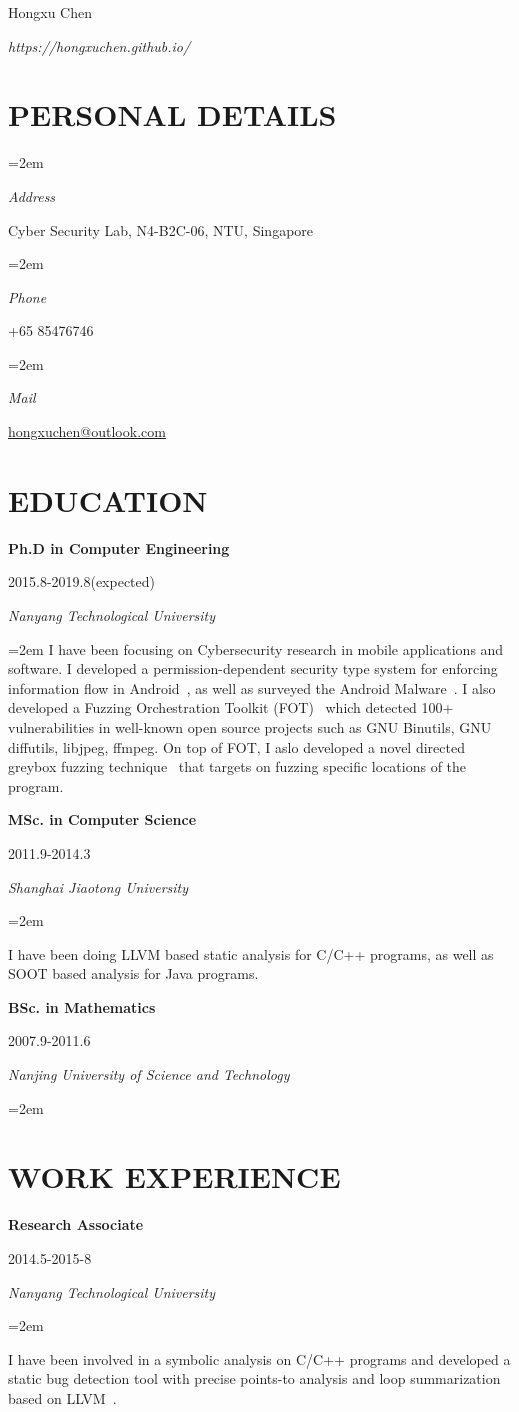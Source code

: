 \documentclass[paper=a4,fontsize=11pt]{scrartcl} %
\newlength{\spacebox}
\newcommand{\sepspace}{\vspace*{9pt}}		%
\newcommand{\MyName}[1]{ %
		\Huge \usefont{OT1}{phv}{b}{n} \hfill #1
		\par \normalsize \normalfont}
\newcommand{\MySlogan}[1]{ %
		\large \usefont{OT1}{phv}{m}{n}\hfill \textit{#1}
		\par \normalsize \normalfont}
\newcommand{\NewPart}[1]{\section*{\uppercase{#1}}}
\newcommand{\PersonalEntry}[2]{
		\noindent\hangindent=2em\hangafter=0 %
		\parbox{\spacebox}{        %
		\textit{#1}}		       %
		\hspace{1.5em} #2 \par}    %
\newcommand{\EducationEntry}[4]{
		\noindent \textbf{#1} \hfill      %
			\parbox{12em}{%
			\hfill\color{Black}#2} \par  %
		\noindent \textit{#3} \par        %
		\noindent\hangindent=2em\hangafter=0 \small #4 %
		\normalsize \par}
\begin{document}
\nocite{*}


\MyName{Hongxu Chen}
\MySlogan{{https://hongxuchen.github.io/}}


\sepspace

\NewPart{Personal details}{}

\PersonalEntry{Address}{Cyber Security Lab, N4-B2C-06, NTU, Singapore}
\PersonalEntry{Phone}{+65 85476746}
\PersonalEntry{Mail}{\url{hongxuchen@outlook.com}}

\NewPart{Education}{}

\EducationEntry{Ph.D in Computer Engineering}{2015.8-2019.8(expected)}{Nanyang Technological University}{
    I have been focusing on Cybersecurity research in mobile applications and software. I developed a permission-dependent security type system for enforcing information flow in Android~\cite{sta}, as well as surveyed the Android Malware~\cite{XueM0TC0Z17}. I also developed a Fuzzing Orchestration Toolkit (FOT)~\cite{fse18-fot} which detected 100+ vulnerabilities in well-known open source projects such as GNU Binutils, GNU diffutils, libjpeg, ffmpeg. On top of FOT, I aslo developed a novel directed greybox fuzzing technique~\cite{hawkeye} that targets on fuzzing specific locations of the program.
}
\sepspace

\EducationEntry{MSc. in Computer Science}{2011.9-2014.3}{Shanghai Jiaotong University}{}
  I have been doing LLVM based static analysis for C/C++ programs, as well as SOOT based analysis for Java programs.
\sepspace

\EducationEntry{BSc. in Mathematics}{2007.9-2011.6}{Nanjing University of Science and Technology}{}

\NewPart{Work experience}{}

\EducationEntry{Research Associate}{2014.5-2015-8}{Nanyang Technological University}{}
  I have been involved in a symbolic analysis on C/C++ programs and developed a static bug detection tool with precise points-to analysis and loop summarization based on LLVM~\cite{XieLLLC15}.
\sepspace
\end{document}
